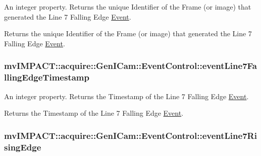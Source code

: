 An integer property. Returns the unique Identifier of the Frame (or image) that generated the Line 7 Falling Edge \hyperlink{classmv_i_m_p_a_c_t_1_1acquire_1_1_event}{Event}. 

Returns the unique Identifier of the Frame (or image) that generated the Line 7 Falling Edge \hyperlink{classmv_i_m_p_a_c_t_1_1acquire_1_1_event}{Event}. \hypertarget{classmv_i_m_p_a_c_t_1_1acquire_1_1_gen_i_cam_1_1_event_control_aaabd930b41f92bfad99e51933f5f647a}{
\subsubsection[{event\+Line7\+Falling\+Edge\+Timestamp}]{ mv\+I\+M\+P\+A\+C\+T\+::acquire\+::\+Gen\+I\+Cam\+::\+Event\+Control\+::event\+Line7\+Falling\+Edge\+Timestamp}}\label{classmv_i_m_p_a_c_t_1_1acquire_1_1_gen_i_cam_1_1_event_control_aaabd930b41f92bfad99e51933f5f647a}


An integer property. Returns the Timestamp of the Line 7 Falling Edge \hyperlink{classmv_i_m_p_a_c_t_1_1acquire_1_1_event}{Event}. 

Returns the Timestamp of the Line 7 Falling Edge \hyperlink{classmv_i_m_p_a_c_t_1_1acquire_1_1_event}{Event}. \hypertarget{classmv_i_m_p_a_c_t_1_1acquire_1_1_gen_i_cam_1_1_event_control_a8a3b9194d922016b7da093ee60b1b1b7}{
\subsubsection[{event\+Line7\+Rising\+Edge}]{ mv\+I\+M\+P\+A\+C\+T\+::acquire\+::\+Gen\+I\+Cam\+::\+Event\+Control\+::event\+Line7\+Rising\+Edge}}\label{classmv_i_m_p_a_c_t_1_1acquire_1_1_gen_i_cam_1_1_event_control_a8a3b9194d922016b7da093ee60b1b1b7}


